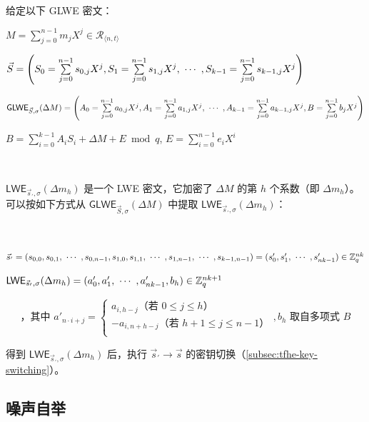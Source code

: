 \begin{tcolorbox}[title={\textbf{\tboxlabel{\ref*{subsec:tfhe-extraction}} GLWE 密文的系数提取}}]
给定以下 GLWE 密文：

$M = \sum\limits_{j=0}^{n-1}m_jX^j \in \mathcal{R}_{\langle n, t \rangle}$

$\vec{S} = \left(S_0 = \sum\limits_{j=0}^{n-1}s_{0,j}X^j, S_1 = \sum\limits_{j=0}^{n-1}s_{1,j}X^j, \text{ } \text{$\cdots$} \text{ }, S_{k-1} = \sum\limits_{j=0}^{n-1}s_{k-1,j}X^j \right)$

$\textsf{GLWE}_{\vec{S}, \sigma}(\Delta M) = \left(A_0 = \sum\limits_{j=0}^{n-1}a_{0,j}X^j, A_1 = \sum\limits_{j=0}^{n-1}a_{1,j}X^j, \text{ } \text{$\cdots$} \text{ }, A_{k-1} = \sum\limits_{j=0}^{n-1}a_{k-1,j}X^j, B = \sum\limits_{j=0}^{n-1}b_{j}X^j\right)$

$B = \sum\limits_{i=0}^{k-1}A_iS_i + \Delta M + E \bmod q$, \text{ } $E = \sum\limits_{i=0}^{n-1}e_iX^i$

$ $

$\textsf{LWE}_{\vec{s}_{'}, \sigma}(\Delta m_h)$ 是一个 LWE 密文，它加密了 $\Delta M$ 的第 $h$ 个系数（即 $\Delta m_h$）。可以按如下方式从 $\textsf{GLWE}_{\vec{S}, \sigma}(\Delta M)$ 中提取 $\textsf{LWE}_{\vec{s}_{'}, \sigma}(\Delta m_h)$：

$ $

$\vec{s}_{'} = (s_{0,0}, s_{0,1}, \text{ } \text{$\cdots$} \text{ }, s_{0,n-1}, s_{1,0}, s_{1,1}, \text{ } \text{$\cdots$} \text{ }, s_{1, n-1}, \text{ } \text{$\cdots$} \text{ }, s_{k-1, n-1}) = (s'_0, s'_1, \text{ } \text{$\cdots$} \text{ }, s'_{nk-1} ) \in \mathbb{Z}_q^{nk}$

$\textsf{LWE}_{\vec{s}_{'}, \sigma}(\Delta m_h) = (a_0', a_1', \text{ } \text{$\cdots$} \text{ } , a_{nk-1}', b_h) \in \mathbb{Z}_q^{nk + 1}$


\[
    \text{，其中 } a'_{n \cdot i + j} =   
\begin{cases}
    a_{i,h - j} \text{（若 } 0 \leq j \leq h\text{）}\\
    -a_{i,n + h - j} \text{（若 } h+1 \leq j \leq n-1\text{）}\\
\end{cases}
, b_h \text{ 取自多项式 } B
\]

得到 $\textsf{LWE}_{\vec{s}_{'}, \sigma}(\Delta m_h)$ 后，执行 $\vec{s}_{'} \rightarrow \vec{s}$ 的密钥切换（\autoref{subsec:tfhe-key-switching}）。

\end{tcolorbox}



\subsection{噪声自举}
\label{subsec:tfhe-noise-bootstrapping}


